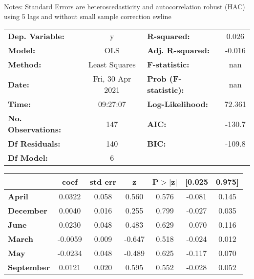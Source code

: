 Notes: \newline
 [1] Standard Errors are heteroscedasticity and autocorrelation robust (HAC) using 5 lags and without small sample correction
ewline\begin{center}
\begin{tabular}{lclc}
\toprule
\textbf{Dep. Variable:}    &        y         & \textbf{  R-squared:         } &     0.026   \\
\textbf{Model:}            &       OLS        & \textbf{  Adj. R-squared:    } &    -0.016   \\
\textbf{Method:}           &  Least Squares   & \textbf{  F-statistic:       } &       nan   \\
\textbf{Date:}             & Fri, 30 Apr 2021 & \textbf{  Prob (F-statistic):} &      nan    \\
\textbf{Time:}             &     09:27:07     & \textbf{  Log-Likelihood:    } &    72.361   \\
\textbf{No. Observations:} &         147      & \textbf{  AIC:               } &    -130.7   \\
\textbf{Df Residuals:}     &         140      & \textbf{  BIC:               } &    -109.8   \\
\textbf{Df Model:}         &           6      & \textbf{                     } &             \\
\bottomrule
\end{tabular}
\begin{tabular}{lcccccc}
                   & \textbf{coef} & \textbf{std err} & \textbf{z} & \textbf{P$> |$z$|$} & \textbf{[0.025} & \textbf{0.975]}  \\
\midrule
\textbf{April}     &       0.0322  &        0.058     &     0.560  &         0.576        &       -0.081    &        0.145     \\
\textbf{December}  &       0.0040  &        0.016     &     0.255  &         0.799        &       -0.027    &        0.035     \\
\textbf{June}      &       0.0230  &        0.048     &     0.483  &         0.629        &       -0.070    &        0.116     \\
\textbf{March}     &      -0.0059  &        0.009     &    -0.647  &         0.518        &       -0.024    &        0.012     \\
\textbf{May}       &      -0.0234  &        0.048     &    -0.489  &         0.625        &       -0.117    &        0.070     \\
\textbf{September} &       0.0121  &        0.020     &     0.595  &         0.552        &       -0.028    &        0.052     \\

\end{tabular}
\end{center}
